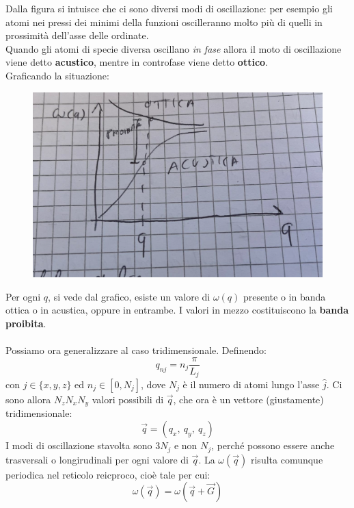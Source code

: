 \documentclass{book}
\begin{document}
            Dalla figura si intuisce che ci sono diversi modi di oscillazione: per esempio gli atomi nei pressi dei minimi della funzioni oscilleranno molto più di quelli in prossimità dell'asse delle ordinate.\\
            Quando gli atomi di specie diversa oscillano \textit{in fase} allora il moto di oscillazione viene detto \textbf{acustico}, mentre in controfase viene detto \textbf{ottico}.\\
            Graficando la situazione:
            \begin{figure}[h!]
                \centering
                \includegraphics[width=0.5\linewidth]{img/imnothere6.png}
            \end{figure}
            Per ogni $q$, si vede dal grafico, esiste un valore di $\omega(q)$ presente o in banda ottica o in acustica, oppure in entrambe. I valori in mezzo costituiscono la \textbf{banda proibita}.
            \paragraph{}
            Possiamo ora generalizzare al caso tridimensionale. Definendo:
            $$q_{nj} = n_{j}\frac{\pi}{L_{j}}$$
            con $j \in \{x, y, z\}$ ed $n_{j} \in [0, N_{j}]$, dove $N_{j}$ è il numero di atomi lungo l'asse $\hat{j}$.
            Ci sono allora $N_{z}N_{x}N_{y}$ valori possibili di $\vec{q}$, che ora è un vettore (giustamente) tridimensionale:
            $$\vec{q} = (q_{x}, \ q_{y}, \ q_{z})$$
            I modi di oscillazione stavolta sono $3N_{j}$ e non $N_{j}$, perché possono essere anche trasversali o longirudinali per ogni valore di $\vec{q}$. La $\omega(\vec{q})$ risulta comunque periodica nel reticolo reicproco, cioè tale per cui:
            $$\omega (\vec{q}) = \omega(\vec{q} + \vec{G})$$
\end{document}
